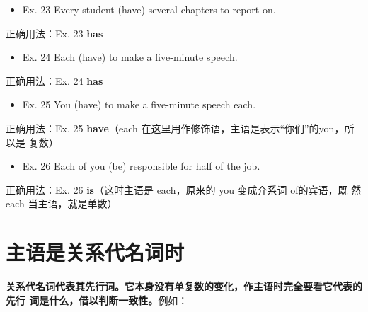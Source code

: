 \documentclass{yufa}
\begin{document}
\begin{mybox}
  \begin{itemize}
  \item   Ex. 23 Every student (have) several chapters to report on.
  \end{itemize}

  \tcblower

  正确用法：Ex. 23 \textbf{has}
\end{mybox}

\begin{mybox}

  \begin{itemize}
  \item   Ex. 24 Each (have) to make a five-minute speech.
  \end{itemize}

  \tcblower

  正确用法：Ex. 24 \textbf{has}
\end{mybox}

\begin{mybox}

  \begin{itemize}
  \item   Ex. 25 You (have) to make a five-minute speech each.
  \end{itemize}

  \tcblower

  正确用法：Ex. 25 \textbf{have}（each 在这里用作修饰语，主语是表示“你们”的yon，所以是
  复数）
\end{mybox}

\begin{mybox}

  \begin{itemize}
  \item   Ex. 26 Each of you (be) responsible for half of the job.
  \end{itemize}

  \tcblower

  正确用法：Ex. 26 \textbf{is}（这时主语是 each，原来的 you 变成介系词 of的宾语，既
  然 each 当主语，就是单数）
\end{mybox}

\section{主语是关系代名词时}

\textbf{关系代名词代表其先行词。它本身没有单复数的变化，作主语时完全要看它代表的先行
  词是什么，借以判断一致性。}例如：
\end{document}
